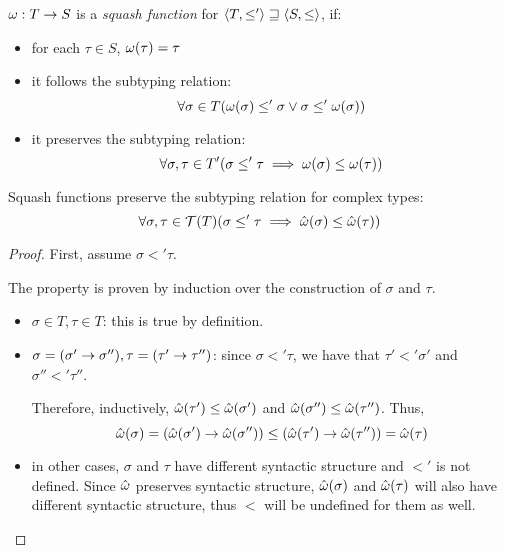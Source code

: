 \documentclass[main.tex]{subfiles}
\begin{document}
\begin{defn}\label{def:squashfn}
    $\omega: T \rightarrow S$ is a \emph{squash function} for
    $\langle  T,  \leq'  \rangle \sqsupseteq \langle  S,  \leq  \rangle$, if:
    \begin{itemize}
        \item for each $\tau \in S$, $\omega(\tau) = \tau$
        \item it follows the subtyping relation:
            \[ \forall \sigma \in T
                (\omega(\sigma) \leq' \sigma \lor \sigma \leq' \omega(\sigma)) \]
        \item it preserves the subtyping relation:
            \[ \forall \sigma, \tau \in T' (\sigma \leq' \tau \implies
                \omega(\sigma) \leq \omega(\tau)) \]
    \end{itemize}
\end{defn}

\begin{property}
    \label{prop:squash:preserve}
    Squash functions preserve the subtyping relation for complex types:
    \[ \forall \sigma, \tau \in \mathcal{T}( T ) (\sigma \leq' \tau \implies
        \hat{\omega}(\sigma) \leq \hat{\omega}(\tau)) \]
\end{property}
\begin{proof}
    First, assume $\sigma \less' \tau$.

    The property is proven by induction over the construction of $\sigma$
    and $\tau$.

    \begin{itemize}
        \item $\sigma \in T, \tau \in T$: this is true by definition.
        \item $\sigma = (\sigma' \rightarrow \sigma''), \tau = (\tau' \rightarrow \tau'')$:
            since $\sigma \less' \tau$, we have that $\tau' \less' \sigma'$
            and $\sigma'' \less' \tau''$.

            Therefore, inductively, $\hat{\omega}(\tau') \leq \hat{\omega}(\sigma')$
            and $\hat{\omega}(\sigma'') \leq \hat{\omega}(\tau'')$. Thus,
            \[
                \hat{\omega}(\sigma) = (\hat{\omega}(\sigma') \rightarrow \hat{\omega}(\sigma''))
                \leq
                (\hat{\omega}(\tau') \rightarrow \hat{\omega}(\tau'')) = \hat{\omega}(\tau)
            \]
        \item in other cases, $\sigma$ and $\tau$ have different syntactic
            structure and $\less'$ is not defined. Since $\hat{\omega}$ preserves
            syntactic structure, $\hat{\omega}(\sigma)$ and $\hat{\omega}(\tau)$
            will also have different syntactic structure, thus $\less$ will
            be undefined for them as well.
    \end{itemize}
\end{proof}
\end{document}
